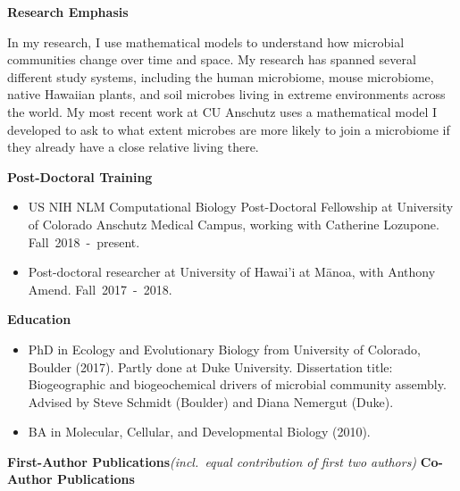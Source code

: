 \documentclass{article}
\begin{document}
%
\vspace{2mm}
%
{\large\textbf{Research Emphasis}}
\begin{adjustwidth}{5mm}{}
  In my research, I use mathematical models to understand how microbial communities change over time and space. My research has spanned several different study systems, including the human microbiome, mouse microbiome, native Hawaiian plants, and soil microbes living in extreme environments across the world. My most recent work at CU Anschutz uses a mathematical model I developed to ask to what extent microbes are more likely to join a microbiome if they already have a close relative living there.
\end{adjustwidth}
%
\vspace{2mm} 
%
{\large  \textbf{Post-Doctoral Training}}
\begin{itemize}[noitemsep,topsep=0pt, leftmargin=5mm]
  \item US NIH NLM Computational Biology Post-Doctoral Fellowship at University of Colorado Anschutz Medical Campus, working with Catherine Lozupone. \mbox{Fall 2018 - present.}
  \item Post-doctoral researcher at University of Hawai'i at Mānoa, with Anthony Amend. \mbox{Fall 2017 - 2018.}
\end{itemize}
%
\vspace{2mm}
{\large  \textbf{Education}}
\begin{itemize}[noitemsep,topsep=0pt, leftmargin=5mm]
  \item PhD in Ecology and Evolutionary Biology from University of Colorado, Boulder (2017). Partly done at Duke University. Dissertation title: Biogeographic and biogeochemical drivers of microbial community assembly. Advised by Steve Schmidt (Boulder) and Diana Nemergut (Duke). 
  \item BA in Molecular, Cellular, and Developmental Biology (2010).
\end{itemize}
\vspace{2mm}
{\large  \textbf{First-Author Publications}}\space\emph{(incl.\ equal contribution of first two authors)}
\vspace{-1em}\vspace{1mm}
\begingroup
	\setlength\bibitemsep{0pt}
	\nocite{*}
	\printbibliography[keyword=firstauthor, heading=none]
\endgroup
%
\vspace{-1em}\vspace{3mm}
{\large  \textbf{Co-Author Publications}}
\vspace{-1em}\vspace{1mm}
\end{document}
